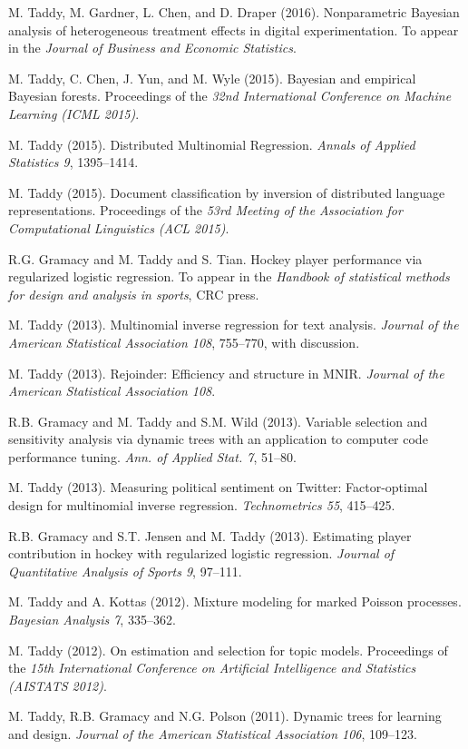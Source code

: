\documentclass[margin,line]{res}
\begin{document}
\begin{resume}
M. Taddy, M. Gardner, L. Chen, and D. Draper (2016).  Nonparametric Bayesian analysis of heterogeneous treatment effects in digital experimentation.  To appear in the {\em Journal of Business and Economic Statistics}.

M. Taddy, C. Chen, J. Yun, and M. Wyle (2015). Bayesian and empirical Bayesian forests.  Proceedings of the {\em 32nd International Conference on Machine Learning (ICML 2015)}.

M. Taddy (2015). Distributed Multinomial Regression.  {\em Annals of Applied Statistics 9}, 1395--1414.

M. Taddy (2015). Document classification by inversion of distributed language representations. Proceedings of the {\em 53rd Meeting of the Association for Computational Linguistics (ACL 2015)}.

R.G. Gramacy and M. Taddy and S. Tian.  Hockey player performance via regularized logistic regression.
To appear in the {\it Handbook of statistical methods for design and analysis in sports}, CRC press.


M. Taddy (2013).  Multinomial inverse regression for text analysis.  
{\it Journal of the American Statistical
  Association 108}, 755--770, with discussion.

M. Taddy (2013).   Rejoinder: Efficiency and structure in MNIR.  {\it Journal of the American Statistical
  Association 108}.




R.B. Gramacy and M. Taddy and S.M. Wild (2013).  Variable selection and
sensitivity analysis via dynamic trees with an application to computer
code performance tuning.  {\it Ann. of Applied
  Stat. 7}, 51--80.

M. Taddy (2013).  Measuring political sentiment on Twitter: Factor-optimal
design for multinomial inverse regression. {\it
  Technometrics 55}, 415--425.


R.B. Gramacy and S.T. Jensen and M. Taddy (2013).  Estimating player contribution in 
hockey with regularized logistic regression. {\it Journal of Quantitative Analysis of Sports 9}, 97--111.

M.  Taddy and A. Kottas (2012). Mixture modeling for marked Poisson processes.
{\it Bayesian Analysis 7}, 335--362.


M. Taddy (2012). On estimation and selection for topic models. Proceedings of the {\it 15th International Conference on
  Artificial Intelligence and Statistics (AISTATS 2012)}.


M. Taddy, R.B. Gramacy and N.G. Polson (2011). Dynamic trees for learning and design.
 {\it Journal of the American Statistical
  Association 106}, 109--123.


\end{resume}
\end{document}
